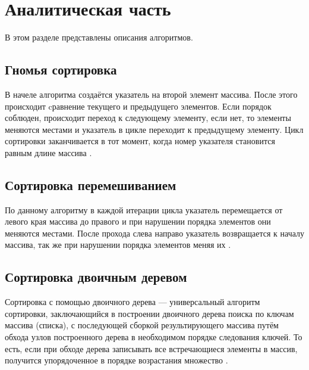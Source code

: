 \chapter{Аналитическая часть}
В этом разделе представлены описания алгоритмов.

\section{Гномья сортировка}
В начеле алгоритма создаётся указатель на второй элемент массива. После этого происходит cравнение текущего и предыдущего элементов. Если порядок соблюден, происходит переход к следующему элементу, если нет, то элементы меняются местами и указатель в цикле переходит к предыдущему элементу. Цикл сортировки заканчивается в тот момент, когда номер указателя становится равным длине массива \cite{shakerGnome}. 

\section{Сортировка перемешиванием}
По данному алгоритму в каждой итерации цикла указатель перемещается от левого края массива до правого и при нарушении порядка элементов они меняются местами. После прохода слева направо указатель возвращается к началу массива, так же при нарушении порядка элементов меняя их \cite{shakerGnome}. 

\section{Сортировка двоичным деревом}
Сортировка с помощью двоичного дерева --- универсальный алгоритм сортировки, заключающийся в построении двоичного дерева поиска по ключам массива (списка), с последующей сборкой результирующего массива путём обхода узлов построенного дерева в необходимом порядке следования ключей. То есть, если при обходе дерева записывать все встречающиеся элементы в массив, получится упорядоченное в порядке возрастания множество \cite{knuth}.
